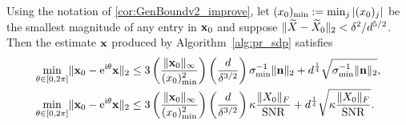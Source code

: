 
\begin{corollary}\label{cor:main_improve}
Using the notation of \cref{cor:GenBoundv2_improve}, let $(x_0)_{\rm min} := \min_j |(x_0)_j|$ be the smallest magnitude of any entry in $\mathbf{x}_0$ and suppose $\lVert\widetilde{X} - \widetilde{X}_0\rVert_2 < \delta^2 / d^{5/2}$.  Then the estimate $\mathbf{x}$ produced by Algorithm~\ref{alg:pr_sdp} satisfies 
\begin{equation}
  \begin{aligned}
    \min_{\theta \in [0, 2\pi]} \lVert\mathbf{x}_0 - \mathrm{e}^{\mathrm{i} \theta} \mathbf{x}\rVert_2 &\leq 3 \left( \frac{\lVert\mathbf{x}_0\rVert_{\infty}}{(x_0)^2_{\rm min}} \right) \left(\frac{d}{\delta^{3/2}} \right) \sigma_{\min}^{-1}\lVert\mathbf n\rVert_2 + d^{\frac{1}{4}} \sqrt{\sigma_{\min}^{-1}\lVert\mathbf n\rVert_2}, \\    
    \min_{\theta \in [0, 2\pi]} \lVert\mathbf{x}_0 - \mathrm{e}^{\mathrm{i} \theta} \mathbf{x}\rVert_2 &\leq 3 \left( \frac{\lVert\mathbf{x}_0\rVert_{\infty}}{(x_0)^2_{\rm min}} \right) \left(\frac{d}{\delta^{3/2}} \right) \kappa \frac{\lVert X_0\rVert_F}{\operatorname{SNR}} + d^{\frac{1}{4}} \sqrt{\kappa \frac{\lVert X_0\rVert_F}{\operatorname{SNR}}}.
  \end{aligned}
  \label{eq:main_improve}
\end{equation}
\end{corollary}

